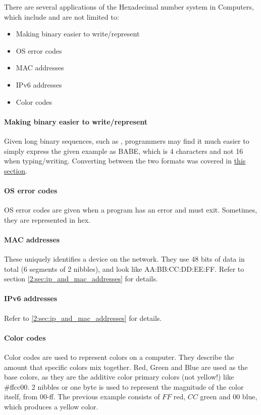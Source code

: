 \documentclass[../main.tex]{subfiles}
\begin{document}
There are several applications of the Hexadecimal number system in Computers, which include and are not limited to:

\begin{itemize}
    \item Making binary easier to write/represent
    \item OS error codes
    \item MAC addresses
    \item IPv6 addresses
    \item Color codes
\end{itemize}

\paragraph{Making binary easier to write/represent}

Given long binary sequences, such as {}, programmers may find it much easier to simply express the given example as {\ccmono BABE}, which is 4 characters and not 16 when typing/writing. Converting between the two formats was covered in \hyperref[sec:1-converting-between-bin-den-and-hexadecimal]{this section}.

\paragraph{OS error codes}

OS error codes are given when a program has an error and must exit. Sometimes, they are represented in hex.

\paragraph{MAC addresses}

These uniquely identifies a device on the network. They use 48 bits of data in total (6 segments of 2 nibbles), and look like {\ccmono AA:BB:CC:DD:EE:FF}. Refer to section \ref{2:sec:ip_and_mac_addresses} for details.

\paragraph{IPv6 addresses}

Refer to \ref{2:sec:ip_and_mac_addresses} for details.

\paragraph{Color codes}

Color codes are used to represent colors on a computer. They describe the amount that specific colors mix together. Red, Green and Blue are used as the base colors, as they are the additive color primary colors (not yellow!) like {\ccmono \#ffcc00}. 2 nibbles or one byte is used to represent the magnitude of the color itself, from 00-ff. The previous example consists of $FF$ red, $CC$ green and $00$ blue, which produces a yellow color.
\end{document}
